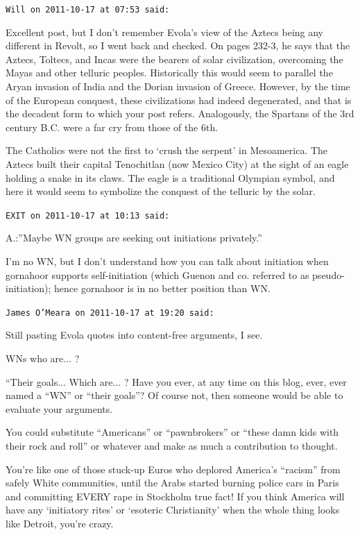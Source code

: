 \begin{footnotesize}
\begin{sffamily}
\texttt{Will on 2011-10-17 at 07:53 said:}

Excellent post, but I don't remember Evola's view of the Aztecs being any different in Revolt, so I went back and checked. On pages 232-3, he says that the Aztecs, Toltecs, and Incas were the bearers of solar civilization, overcoming the Mayas and other telluric peoples. Historically this would seem to parallel the Aryan invasion of India and the Dorian invasion of Greece. However, by the time of the European conquest, these civilizations had indeed degenerated, and that is the decadent form to which your post refers. Analogously, the Spartans of the 3rd century B.C. were a far cry from those of the 6th.

The Catholics were not the first to `crush the serpent' in Mesoamerica. The Aztecs built their capital Tenochitlan (now Mexico City) at the sight of an eagle holding a snake in its claws. The eagle is a traditional Olympian symbol, and here it would seem to symbolize the conquest of the telluric by the solar.

\hfill

\texttt{EXIT on 2011-10-17 at 10:13 said:}

A.:''Maybe WN groups are seeking out initiations privately.''

I'm no WN, but I don't understand how you can talk about initiation when gornahoor supports self-initiation (which Guenon and co. referred to as pseudo-initiation); hence gornahoor is in no better position than WN.

\hfill

\texttt{James O'Meara on 2011-10-17 at 19:20 said:}

Still pasting Evola quotes into content-free arguments, I see.

WNs who are... ? 

``Their goals... Which are... ? Have you ever, at any time on this blog, ever, ever named a ``WN'' or ``their goals''? Of course not, then someone would be able to evaluate your arguments.

You could substitute ``Americans'' or ``pawnbrokers'' or ``these damn kids with their rock and roll'' or whatever and make as much a contribution to thought.

You're like one of those stuck-up Euros who deplored America's ``racism'' from safely White communities, until the Arabs started burning police cars in Paris and committing EVERY rape in Stockholm true fact! If you think America will have any `initiatory rites' or `esoteric Christianity' when the whole thing looks like Detroit, you're crazy.


\end{sffamily}
\end{footnotesize}
